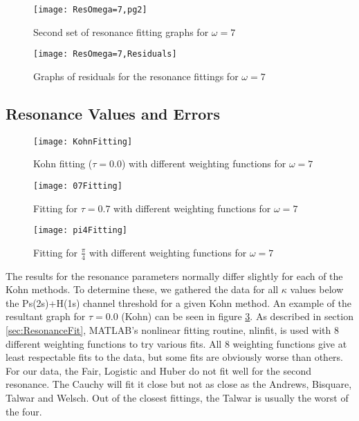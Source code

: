\documentclass[Dissertation.tex]{subfiles}
\begin{document}
\begin{figure}[H]
	\centering
	\texttt{[image: ResOmega=7,pg2]}
	\caption{Second set of resonance fitting graphs for $\omega = 7$}
	\label{fig:ResOmega=7,pg2}
\end{figure}

\begin{figure}[H]
	\centering
	\texttt{[image: ResOmega=7,Residuals]}
	\caption{Graphs of residuals for the resonance fittings for $\omega = 7$}
	\label{fig:ResOmega=7,Residuals}
\end{figure}


\subsection{Resonance Values and Errors}
\label{sec:ResonanceErrors}

\begin{figure}[H]
	\centering
	\texttt{[image: KohnFitting]}
	\caption{Kohn fitting ($\tau = 0.0$) with different weighting functions for $\omega = 7$}
	\label{fig:KohnFitting}
\end{figure}

\begin{figure}[H]
	\centering
	\texttt{[image: 07Fitting]}
	\caption{Fitting for $\tau = 0.7$ with different weighting functions for $\omega = 7$}
	\label{fig:07Fitting}
\end{figure}

\begin{figure}[H]
	\centering
	\texttt{[image: pi4Fitting]}
	\caption{Fitting for $\frac{\pi}{4}$ with different weighting functions for $\omega = 7$}
	\label{fig:pi4Fitting}
\end{figure}

The results for the resonance parameters normally differ slightly for each of the Kohn methods.  To determine these, we gathered the data for all $\kappa$ values below the Ps(2s)+H(1s) channel threshold for a given Kohn method.  An example of the resultant graph for $\tau = 0.0$ (Kohn) can be seen in figure \ref{fig:KohnFitting}.  As described in section \ref{sec:ResonanceFit}, MATLAB's nonlinear fitting routine, nlinfit, is used with 8 different weighting functions to try various fits.  All 8 weighting functions give at least respectable fits to the data, but some fits are obviously worse than others.  For our data, the Fair, Logistic and Huber do not fit well for the second resonance.  The Cauchy will fit it close but not as close as the Andrews, Bisquare, Talwar and Welsch.  Out of the closest fittings, the Talwar is usually the worst of the four.
\end{document}
